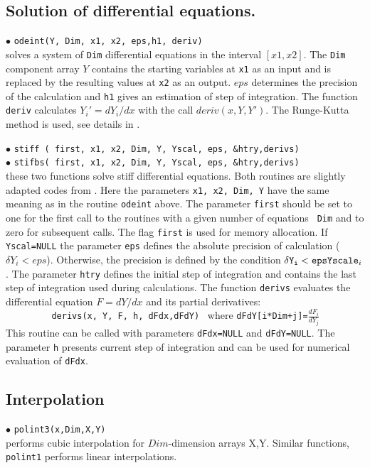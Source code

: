\documentclass[12pt,a4paper]{article}
\begin{document}
\subsection{ Solution of differential equations.} 
\noindent$\bullet$ \verb|odeint(Y, Dim, x1, x2, eps,h1, deriv)|\\
solves a  system of \verb|Dim| differential  equations in the interval 
$[x1,x2]$. The  \verb|Dim| component array $Y$ contains the starting variables at \verb|x1| as an input and is replaced by the
resulting values at \verb|x2| as an output. $eps$ determines the precision of the 
calculation and  \verb|h1| gives an estimation of step of integration.  
The function \verb|deriv| calculates 
$Y_i' = dY_i/dx$ with the call $deriv(x,Y,Y')$. The Runge-Kutta method is
used, see details in \cite{Numerical}. 


\noindent$\bullet$ \verb|stiff ( first, x1, x2, Dim, Y, Yscal, eps, &htry,derivs)|\\
\noindent$\bullet$ \verb|stifbs( first, x1, x2, Dim, Y, Yscal, eps, &htry,derivs)|\\
these two functions solve  stiff  differential
equations. Both routines  are slightly adapted codes from
\cite{Numerical}. Here the parameters  {\tt x1, x2, Dim, Y} have the same
meaning as in the routine  {\tt odeint}  above. The parameter {\tt first}
should be set to one for the first call to the routines with a given number of equations {\tt
Dim} and to zero for subsequent calls.  The flag {\tt first} is used for memory allocation.  If {\tt Yscal=NULL}  the parameter
{\tt eps} defines the absolute precision of calculation ($\delta Y_i < eps$).  Otherwise, the
precision is defined by the  condition $\delta {\tt Y_i} < {\tt eps} {\tt Yscale}_i$. 
The parameter {\tt htry} defines the initial step of integration and contains the last step of
integration used during  calculations.
The function {\tt derivs} evaluates the differential equation
$F= dY/dx$  and its partial derivatives:\\  
\verb|         derivs(x, Y, F, h, dFdx,dFdY) | where
\verb|dFdY[i*Dim+j]=|$\frac{dF_i}{dY_j}$\\
This routine can
be called with parameters {\tt dFdx=NULL} and  {\tt dFdY=NULL}. The  parameter
{\tt h} presents current step of integration and can be used for numerical
evaluation of  {\tt dFdx}. 

\subsection{Interpolation}
\noindent$\bullet$ \verb|polint3(x,Dim,X,Y)|\\
performs   cubic interpolation for $Dim$-dimension arrays X,Y. Similar 
functions, \verb|polint1|  performs linear interpolations.
\end{document}
